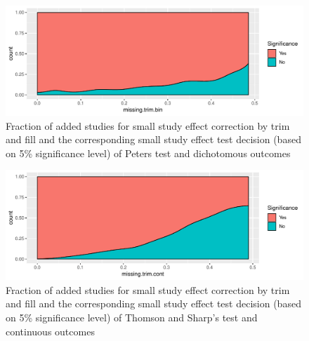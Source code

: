 \documentclass[11pt,a4paper,twoside]{book}\usepackage[]{graphicx}\usepackage[]{color}
\newenvironment{knitrout}{}{} %
\begin{document}
\begin{figure}
\begin{knitrout}
\color{fgcolor}

{\centering \includegraphics[width=\textwidth-3cm]{figure/ch02_figunnamed-chunk-25-1} 

}



\end{knitrout}
\caption{Fraction of added studies for small study effect correction by trim and fill and the corresponding small study effect test decision (based on 5\% significance level) of Peters test and dichotomous outcomes}
\label{trimfill.pvalues.bin}
\end{figure}

\begin{figure}
\begin{knitrout}
\color{fgcolor}

{\centering \includegraphics[width=\textwidth-3cm]{figure/ch02_figunnamed-chunk-26-1} 

}



\end{knitrout}
\caption{Fraction of added studies for small study effect correction by trim and fill and the corresponding small study effect test decision (based on 5\% significance level) of Thomson and Sharp's test and continuous outcomes}
\label{trimfill.pvalues.cont}
\end{figure}
\end{document}
